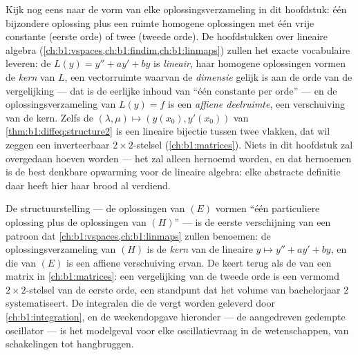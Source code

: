 \begin{remark}\label{rem:b1:diffeq:interlude}
Kijk nog eens naar de vorm van elke oplossingsverzameling in dit
hoofdstuk: één bijzondere oplossing plus een ruimte homogene oplossingen
met één vrije constante (eerste orde) of twee (tweede orde). De
hoofdstukken over lineaire algebra
(\cref{ch:b1:vspaces,ch:b1:findim,ch:b1:linmaps}) zullen het exacte
vocabulaire leveren: de  $L(y) = y'' + ay' + by$ is
\emph{lineair}, haar homogene oplossingen vormen de \emph{kern} van $L$,
een vectorruimte waarvan de \emph{dimensie} gelijk is aan de orde van de
vergelijking --- dat is de eerlijke inhoud van ``één constante per
orde'' --- en de oplossingsverzameling van $L(y) = f$ is een
\emph{affiene deelruimte}, een verschuiving van de kern. Zelfs de
 $(\lambda, \mu) \mapsto (y(x_0), y'(x_0))$ van
\cref{thm:b1:diffeq:structure2} is een lineaire bijectie tussen twee
vlakken, dat wil zeggen een inverteerbaar $2 \times 2$-stelsel
(\cref{ch:b1:matrices}). Niets in dit hoofdstuk zal overgedaan hoeven
worden --- het zal alleen hernoemd worden, en dat hernoemen is de best
denkbare opwarming voor de lineaire algebra: elke abstracte definitie
daar heeft hier haar brood al verdiend.
\end{remark}

\begin{remark}\label{rem:b1:diffeq:whereused}
De structuurstelling --- de oplossingen van $(E)$ vormen ``één
particuliere oplossing plus de oplossingen van $(H)$'' --- is de eerste
verschijning van een patroon dat
\cref{ch:b1:vspaces,ch:b1:linmaps} zullen benoemen: de
oplossingsverzameling van $(H)$ is de \emph{kern} van de lineaire
 $y \mapsto y'' + ay' + by$, en die van $(E)$ is een affiene
verschuiving ervan. De  keert terug als de
 van een matrix in \cref{ch:b1:matrices}: een
vergelijking van de tweede orde is een vermomd $2 \times 2$-stelsel van
de eerste orde, een standpunt dat het volume van bachelorjaar 2
systematiseert. De integralen die de  vergt worden
geleverd door \cref{ch:b1:integration}, en de weekendopgave hieronder ---
de aangedreven gedempte oscillator --- is het modelgeval voor elke
oscillatievraag in de wetenschappen, van schakelingen tot hangbruggen.
\end{remark}

